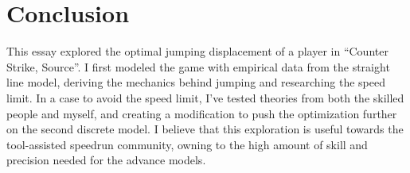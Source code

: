 

\section{Conclusion}
This essay explored the optimal jumping displacement of a player in ``Counter Strike, Source''. I first modeled the game with empirical data from the straight line model, deriving the mechanics behind jumping and researching the speed limit. In a case to avoid the speed limit, I've tested theories from both the skilled people and myself, and creating a modification to push the optimization further on the second discrete model. I believe that this exploration is useful towards the tool-assisted speedrun community, owning to the high amount of skill and precision needed for the advance models.

